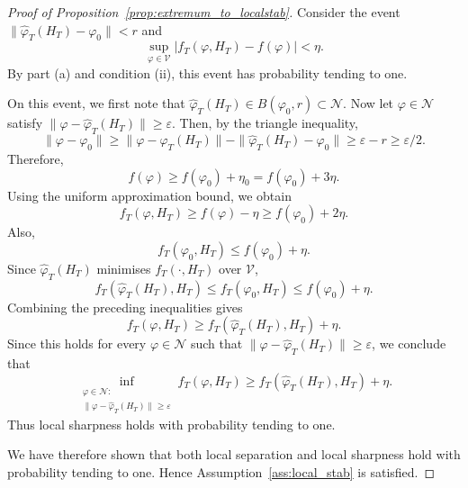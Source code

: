\documentclass[12pt]{article}
\numberwithin{equation}{section}
\begin{document}
\begin{proof}[Proof of Proposition~\ref{prop:extremum_to_localstab}]
Consider the event
$\|\hat{\varphi}_T(H_T)-\varphi_0\|<r$
and
\begin{equation}
\sup_{\varphi\in\mathcal V}
|f_T(\varphi,H_T)-f(\varphi)|
<
\eta.
\end{equation}
By part (a) and condition (ii), this event has probability tending to one.

On this event, we first note that
$\hat{\varphi}_T(H_T)\in B(\varphi_0,r)\subset\mathcal N$.
Now let $\varphi\in\mathcal N$ satisfy
$\|\varphi-\hat{\varphi}_T(H_T)\|\ge\varepsilon$.
Then, by the triangle inequality,
\begin{equation}
\|\varphi-\varphi_0\|
\ge
\|\varphi-\hat{\varphi}_T(H_T)\|
-
\|\hat{\varphi}_T(H_T)-\varphi_0\|
\ge
\varepsilon-r
\ge
\varepsilon/2.
\end{equation}
Therefore,
\begin{equation}
f(\varphi)\ge f(\varphi_0)+\eta_0=f(\varphi_0)+3\eta.
\end{equation}
Using the uniform approximation bound, we obtain
\begin{equation}
f_T(\varphi,H_T)
\ge
f(\varphi)-\eta
\ge
f(\varphi_0)+2\eta.
\end{equation}
Also,
\begin{equation}
f_T(\varphi_0,H_T)\le f(\varphi_0)+\eta.
\end{equation}
Since $\hat{\varphi}_T(H_T)$ minimises $f_T(\cdot,H_T)$ over $\mathcal V$,
\begin{equation}
f_T(\hat{\varphi}_T(H_T),H_T)\le f_T(\varphi_0,H_T)\le f(\varphi_0)+\eta.
\end{equation}
Combining the preceding inequalities gives
\begin{equation}
f_T(\varphi,H_T)
\ge
f_T(\hat{\varphi}_T(H_T),H_T)+\eta.
\end{equation}
Since this holds for every $\varphi\in\mathcal N$ such that
$\|\varphi-\hat{\varphi}_T(H_T)\|\ge\varepsilon$,
we conclude that
\begin{equation}
\inf_{\substack{\varphi\in\mathcal N:\\
\|\varphi-\hat{\varphi}_T(H_T)\|\ge\varepsilon}}
f_T(\varphi,H_T)
\ge
f_T(\hat{\varphi}_T(H_T),H_T)+\eta.
\end{equation}
Thus local sharpness holds with probability tending to one.

We have therefore shown that both local separation and local sharpness hold with probability tending to one. Hence Assumption~\ref{ass:local_stab} is satisfied.
\end{proof}
\end{document}
